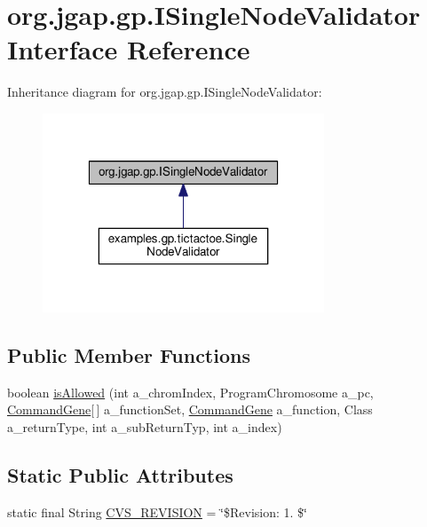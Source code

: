 \hypertarget{interfaceorg_1_1jgap_1_1gp_1_1_i_single_node_validator}{\section{org.\-jgap.\-gp.\-I\-Single\-Node\-Validator Interface Reference}
\label{interfaceorg_1_1jgap_1_1gp_1_1_i_single_node_validator}
}


Inheritance diagram for org.\-jgap.\-gp.\-I\-Single\-Node\-Validator\-:
\nopagebreak
\begin{figure}[H]
\begin{center}
\leavevmode
\includegraphics[width=238pt]{interfaceorg_1_1jgap_1_1gp_1_1_i_single_node_validator__inherit__graph}
\end{center}
\end{figure}
\subsection*{Public Member Functions}
\begin{DoxyCompactItemize}
\item 
boolean \hyperlink{interfaceorg_1_1jgap_1_1gp_1_1_i_single_node_validator_a8c657d357179ee11ac73015301fa2789}{is\-Allowed} (int a\-\_\-chrom\-Index, Program\-Chromosome a\-\_\-pc, \hyperlink{classorg_1_1jgap_1_1gp_1_1_command_gene}{Command\-Gene}\mbox{[}$\,$\mbox{]} a\-\_\-function\-Set, \hyperlink{classorg_1_1jgap_1_1gp_1_1_command_gene}{Command\-Gene} a\-\_\-function, Class a\-\_\-return\-Type, int a\-\_\-sub\-Return\-Typ, int a\-\_\-index)
\end{DoxyCompactItemize}
\subsection*{Static Public Attributes}
\begin{DoxyCompactItemize}
\item 
static final String \hyperlink{interfaceorg_1_1jgap_1_1gp_1_1_i_single_node_validator_a5c912001980b26394d7ea604fd12ba13}{C\-V\-S\-\_\-\-R\-E\-V\-I\-S\-I\-O\-N} = \char`\"{}\$Revision\-: 1. \$\char`\"{}
\end{DoxyCompactItemize}


